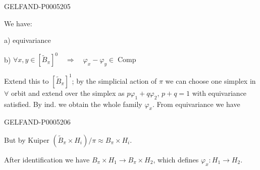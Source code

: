 \begin{GelfandAdjacentEvidence}{GELFAND-P000520}{5}

We have:

a) equivariance

b) $\forall x,y\in[\widetilde B_\pi]^0\quad\Rightarrow\quad
\varphi_x-\varphi_y\in\operatorname{Comp}$

Extend this to $[\widetilde B_\pi]^1$; by the simplicial action of $\pi$ we can choose one simplex in $\forall$ orbit and extend over the simplex as
$p\varphi_1+q\varphi_2$, $p+q=1$ with equivariance satisfied.
By ind. we obtain the whole family $\varphi_x$. From equivariance we have
\end{GelfandAdjacentEvidence}
\begin{GelfandAdjacentEvidence}{GELFAND-P000520}{6}


But by Kuiper $(\widetilde B_\pi\times H_i)/\pi\approx B_\pi\times H_i$.
\end{GelfandAdjacentEvidence}

After identification we have $B_\pi\times H_1\to B_\pi\times H_2$,
which defines $\varphi_x:H_1\to H_2$.


